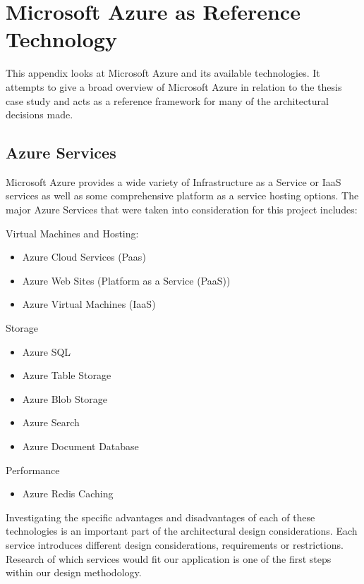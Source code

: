 \chapter{Microsoft Azure as Reference Technology}
\label{appendix:azure}
This appendix looks at Microsoft Azure and its available technologies. It attempts to give a broad overview of Microsoft Azure in relation to the thesis case study and acts as a reference framework for many of the architectural decisions made.

\section{Azure Services}

Microsoft Azure provides a wide variety of Infrastructure as a Service or IaaS  services as well as some comprehensive platform as a service hosting options. The major Azure Services that were taken into consideration for this project includes:

Virtual Machines and Hosting:
\begin{itemize}
\item Azure Cloud Services (Paas)
\item Azure Web Sites (Platform as a Service (PaaS))
\item Azure Virtual Machines (IaaS)
\end{itemize}

Storage
\begin{itemize}
\item Azure SQL
\item Azure Table Storage
\item Azure Blob Storage
\item Azure Search
\item Azure Document Database
\end{itemize}

Performance
\begin{itemize}
\item Azure Redis Caching
\end{itemize}

Investigating the specific advantages and disadvantages of each of these technologies is an important part of the architectural design considerations. Each service introduces different design considerations, requirements or restrictions. Research of which services would fit our application is one of the first steps within our design methodology.

